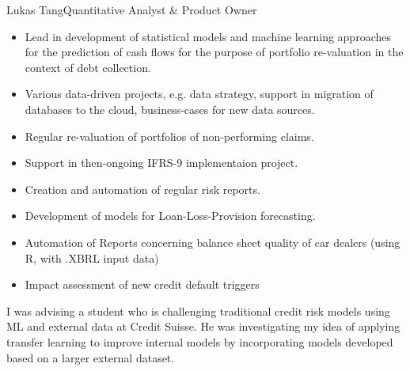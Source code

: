 \documentclass{article}
\begin{document}
\begin{cv}[avatar]{Lukas Tang}{Quantitative Analyst \& Product Owner}
\begin{cvevent}[07/2018][02/2021]
    \begin{itemize}
        \item Lead in development of statistical models and machine learning approaches for the prediction of cash flows for the purpose of portfolio re-valuation in the context of debt collection.
        \item Various data-driven projects, e.g. data strategy, support in migration of databases to the cloud, business-cases for new data sources. 
        \item Regular re-valuation of portfolios of non-performing claims.
    \end{itemize}
\end{cvevent}

\begin{cvevent}[09/2016][06/2018]
    \begin{itemize}
        \item Support in then-ongoing IFRS-9 implementaion project.
        \item Creation and automation of regular risk reports.
        \item Development of models for Loan-Loss-Provision forecasting.
    \end{itemize}
\end{cvevent}

\begin{cvevent}[09/2015][02/2016]
    \begin{itemize}
        \item Automation of Reports concerning balance sheet quality of car dealers (using R, with .XBRL input data)
        \item Impact assessment of new credit default triggers 
    \end{itemize}
\end{cvevent}




\begin{cvevent}[2023]
    I was advising a student who is challenging traditional credit risk models using ML and external data at Credit Suisse. He was investigating my idea of applying transfer learning to improve internal models by incorporating models developed based on a larger external dataset.
\end{cvevent}


\end{cv}
\end{document}

